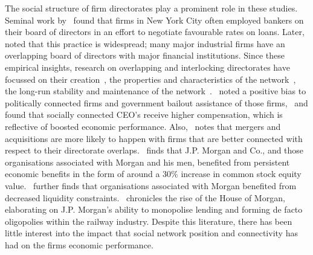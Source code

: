\documentclass[11pt,fleqn]{article}
\begin{document}
The social structure of firm directorates play a prominent role in these studies. Seminal work by~\citet{Dooley1969} found that firms in New York City often employed bankers on their board of directors in an effort to negotiate favourable rates on loans. Later,~\citet{Levine1972} noted that this practice is widespread; many major industrial firms have an overlapping board of directors with major financial institutions. Since these empirical insights, research on overlapping and interlocking directorates have focussed on their creation~\citep{PfefferSalancik1978}, the properties and characteristics of the network~\citep{DavisYooBaker2003}, the long-run stability and maintenance of the network~\citep{BeckmanHaunschildPhillips2004}.~\citet{FaccioMcConnellMasulis2006} noted a positive bias to politically connected firms and government bailout assistance of those firms,~\citet{HwangKim2009} and \citet{HwangKim2012} found that socially connected CEO's receive higher compensation, which is reflective of boosted economic performance. Also,~\citet{StuartYim2010} notes that mergers and acquisitions are more likely to happen with firms that are better connected with respect to their directorate overlaps.~\citet{deLong1991} finds that J.P. Morgan and Co., and those organisations associated with Morgan and his men, benefited from persistent economic benefits in the form of around a $30\%$ increase in common stock equity value.~\citet{Ramirez1995} further finds that organisations associated with Morgan benefited from decreased liquidity constraints.~\citet{Chernow2010} chronicles the rise of the House of Morgan, elaborating on J.P. Morgan's ability to monopolise lending and forming de facto oligopolies within the railway industry. Despite this literature, there has been little interest into the impact that social network position and connectivity has had on the firms economic performance.
\end{document}
